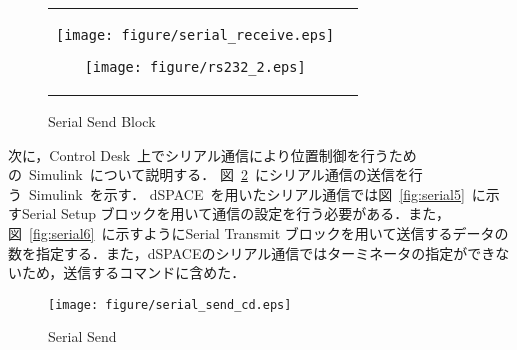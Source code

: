 \documentclass[a4paper,12pt]{article_vdlab_sotsuron}
\begin{document}
\vspace{5mm}
\begin{figure}[h]
    \begin{tabular}{cc}
      \begin{minipage}{0.45\hsize}
	\centering
	  \texttt{[image: figure/serial\_receive.eps]}
	  \begin{center}
	  \vspace{2mm}
	  \caption{Serial Recieve}
      \label{fig:serial_recieve}
	  \end{center}
	\end{minipage}
       \begin{minipage}{0.5\hsize}
	\centering
	\hspace{2mm}
	  \texttt{[image: figure/rs232\_2.eps]}
	  \begin{center}
	  \vspace{2mm}
	  \caption{Serial Send Block}
	  \label{fig:rs_2}
	  \end{center}
      \end{minipage}
    \end{tabular}
\end{figure}

\newpage
次に，Control Desk~上でシリアル通信により位置制御を行うための~Simulink~について説明する．
図~\ref{fig:serial4}~にシリアル通信の送信を行う~Simulink~を示す．
dSPACE~を用いたシリアル通信では図~\ref{fig:serial5}~に示すSerial Setup ブロックを用いて通信の設定を行う必要がある．また，図~\ref{fig:serial6}~に示すようにSerial Transmit ブロックを用いて送信するデータの数を指定する．また，dSPACEのシリアル通信ではターミネータの指定ができないため，送信するコマンドに含めた．

\vspace{2mm}
\begin{figure}[h]
  \begin{center}
    \texttt{[image: figure/serial\_send\_cd.eps]}
    \vspace{3mm}
    \caption{Serial Send}
    \label{fig:serial4}
  \end{center}
\end{figure}
\end{document}
